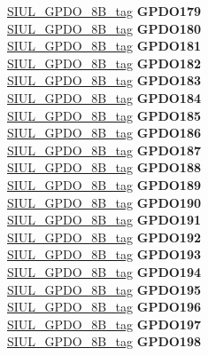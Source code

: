 \begin{DoxyCompactItemize}
\begin{tabbing}
\>\>\mbox{\hyperlink{unionSIUL__GPDO__8B__tag}{SIUL\_GPDO\_8B\_tag}} {\bfseries GPDO179}\\
\>\>\mbox{\hyperlink{unionSIUL__GPDO__8B__tag}{SIUL\_GPDO\_8B\_tag}} {\bfseries GPDO180}\\
\>\>\mbox{\hyperlink{unionSIUL__GPDO__8B__tag}{SIUL\_GPDO\_8B\_tag}} {\bfseries GPDO181}\\
\>\>\mbox{\hyperlink{unionSIUL__GPDO__8B__tag}{SIUL\_GPDO\_8B\_tag}} {\bfseries GPDO182}\\
\>\>\mbox{\hyperlink{unionSIUL__GPDO__8B__tag}{SIUL\_GPDO\_8B\_tag}} {\bfseries GPDO183}\\
\>\>\mbox{\hyperlink{unionSIUL__GPDO__8B__tag}{SIUL\_GPDO\_8B\_tag}} {\bfseries GPDO184}\\
\>\>\mbox{\hyperlink{unionSIUL__GPDO__8B__tag}{SIUL\_GPDO\_8B\_tag}} {\bfseries GPDO185}\\
\>\>\mbox{\hyperlink{unionSIUL__GPDO__8B__tag}{SIUL\_GPDO\_8B\_tag}} {\bfseries GPDO186}\\
\>\>\mbox{\hyperlink{unionSIUL__GPDO__8B__tag}{SIUL\_GPDO\_8B\_tag}} {\bfseries GPDO187}\\
\>\>\mbox{\hyperlink{unionSIUL__GPDO__8B__tag}{SIUL\_GPDO\_8B\_tag}} {\bfseries GPDO188}\\
\>\>\mbox{\hyperlink{unionSIUL__GPDO__8B__tag}{SIUL\_GPDO\_8B\_tag}} {\bfseries GPDO189}\\
\>\>\mbox{\hyperlink{unionSIUL__GPDO__8B__tag}{SIUL\_GPDO\_8B\_tag}} {\bfseries GPDO190}\\
\>\>\mbox{\hyperlink{unionSIUL__GPDO__8B__tag}{SIUL\_GPDO\_8B\_tag}} {\bfseries GPDO191}\\
\>\>\mbox{\hyperlink{unionSIUL__GPDO__8B__tag}{SIUL\_GPDO\_8B\_tag}} {\bfseries GPDO192}\\
\>\>\mbox{\hyperlink{unionSIUL__GPDO__8B__tag}{SIUL\_GPDO\_8B\_tag}} {\bfseries GPDO193}\\
\>\>\mbox{\hyperlink{unionSIUL__GPDO__8B__tag}{SIUL\_GPDO\_8B\_tag}} {\bfseries GPDO194}\\
\>\>\mbox{\hyperlink{unionSIUL__GPDO__8B__tag}{SIUL\_GPDO\_8B\_tag}} {\bfseries GPDO195}\\
\>\>\mbox{\hyperlink{unionSIUL__GPDO__8B__tag}{SIUL\_GPDO\_8B\_tag}} {\bfseries GPDO196}\\
\>\>\mbox{\hyperlink{unionSIUL__GPDO__8B__tag}{SIUL\_GPDO\_8B\_tag}} {\bfseries GPDO197}\\
\>\>\mbox{\hyperlink{unionSIUL__GPDO__8B__tag}{SIUL\_GPDO\_8B\_tag}} {\bfseries GPDO198}\\

\end{tabbing}
\end{DoxyCompactItemize}
